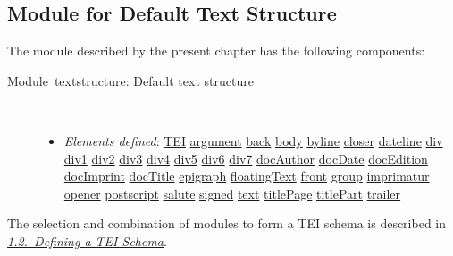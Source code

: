 \subsection[{Module for Default Text Structure}]{Module for Default Text Structure}\label{DSSTRUC}\par
The module described by the present chapter has the following components: \begin{description}

\item[{Module textstructure: Default text structure}]\hspace{1em}\hfill\linebreak
\mbox{}\\[-10pt] \begin{itemize}
\item {\itshape Elements defined}: \hyperref[TEI.TEI]{TEI} \hyperref[TEI.argument]{argument} \hyperref[TEI.back]{back} \hyperref[TEI.body]{body} \hyperref[TEI.byline]{byline} \hyperref[TEI.closer]{closer} \hyperref[TEI.dateline]{dateline} \hyperref[TEI.div]{div} \hyperref[TEI.div1]{div1} \hyperref[TEI.div2]{div2} \hyperref[TEI.div3]{div3} \hyperref[TEI.div4]{div4} \hyperref[TEI.div5]{div5} \hyperref[TEI.div6]{div6} \hyperref[TEI.div7]{div7} \hyperref[TEI.docAuthor]{docAuthor} \hyperref[TEI.docDate]{docDate} \hyperref[TEI.docEdition]{docEdition} \hyperref[TEI.docImprint]{docImprint} \hyperref[TEI.docTitle]{docTitle} \hyperref[TEI.epigraph]{epigraph} \hyperref[TEI.floatingText]{floatingText} \hyperref[TEI.front]{front} \hyperref[TEI.group]{group} \hyperref[TEI.imprimatur]{imprimatur} \hyperref[TEI.opener]{opener} \hyperref[TEI.postscript]{postscript} \hyperref[TEI.salute]{salute} \hyperref[TEI.signed]{signed} \hyperref[TEI.text]{text} \hyperref[TEI.titlePage]{titlePage} \hyperref[TEI.titlePart]{titlePart} \hyperref[TEI.trailer]{trailer}
\end{itemize} 
\end{description}  The selection and combination of modules to form a TEI schema is described in \textit{\hyperref[STIN]{1.2.\ Defining a TEI Schema}}.